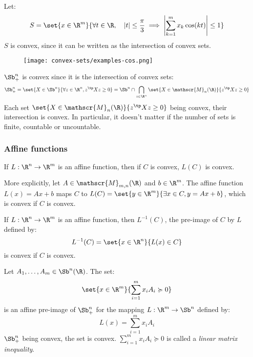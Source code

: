 \begin{example}
    Let:
    \begin{equation*}
        S = \set{x\in\R^m}{\forall t\in\R, \quad |t|\leq\frac{\pi}{3} \implies \left|\sum_{k=1}^m x_k\cos(kt)\right|\leq 1}
    \end{equation*}
    $S$ is convex, since it can be written as the intersection of convex sets.
    \begin{figure}[H]
        \centering
        \texttt{[image: convex-sets/examples-cos.png]}
    \end{figure}
\end{example}

\begin{example}
    $\Sb^n_+$ is convex since it is the intersection of convex sets:
    \begin{equation*}
        \Sb^n_+ = \set{X\in\Sb^n}{\forall z\in\R^n, z^\tp Xz\geq 0} = \Sb^n \cap \bigcap_{z\in\R^n} \set{X\in\mathscr{M}_n(\R)}{z^\tp Xz\geq 0}
    \end{equation*}
    Each set $\set{X\in\mathscr{M}_n(\R)}{z^\tp Xz\geq 0}$ being convex, their intersection is convex. In particular, it doesn't matter if the number of sets is finite, countable or uncountable.
\end{example}

\subsubsection{Affine functions}
\begin{property}
    If $L:\R^n\to\R^m$ is an affine function, then if $C$ is convex, $L(C)$ is convex.
\end{property}

More explicitly, let $A\in\mathscr{M}_{m,n}(\R)$ and $b\in\R^m$. The affine function $L(x) = Ax + b$ maps $C$ to $L(C) = \set{y\in\R^m}{\exists x\in C, y = Ax + b}$, which is convex if $C$ is convex.

\begin{property}
    If $L:\R^n\to\R^m$ is an affine function, then $L^{-1}(C)$, the pre-image of $C$ by $L$ defined by:
    \begin{equation*}
        L^{-1}(C) = \set{x\in\R^n}{L(x)\in C}
    \end{equation*}
    is convex if $C$ is convex.
\end{property}

\begin{example}
    Let $A_1, \dots, A_m\in\Sb^n(\R)$. The set:
    \begin{equation*}
        \set{x\in\R^m}{\sum_{i=1}^m x_iA_i\succcurlyeq 0}
    \end{equation*}
    is an affine pre-image of $\Sb_+^n$ for the mapping $L:\R^m\to\Sb^n$ defined by:
    \begin{equation*}
        L(x) = \sum_{i=1}^m x_iA_i
    \end{equation*}
    $\Sb_+^n$ being convex, the set is convex. $\sum_{i=1}^m x_iA_i\succcurlyeq 0$ is called a \emph{linear matrix inequality}.
\end{example}